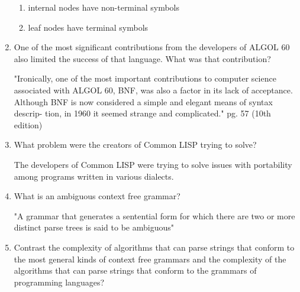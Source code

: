 \begin{enumerate}
\begin{answer}
  \begin{enumerate}
    \item internal nodes have non-terminal symbols
    \item leaf nodes have terminal symbols
    \end{enumerate}

    \end{answer}


  \item One of the most significant contributions from the developers
    of ALGOL 60 also limited the success of that language. What was
    that contribution?

  \begin{answer}

    "Ironically, one of the most important contributions to computer
    science associated with ALGOL 60, BNF, was also a factor in its
    lack of acceptance. Although BNF is now considered a simple and
    elegant means of syntax descrip- tion, in 1960 it seemed strange
    and complicated."  pg. 57 (10th edition)

    \end{answer}

  \item What problem were the creators of Common LISP trying to solve?

  \begin{answer}

    The developers of Common LISP were trying to solve issues with
    portability among programs written in various dialects.

    \end{answer}

  \item What is an ambiguous context free grammar?

  \begin{answer}

    "A grammar that generates a sentential form for which there are
    two or more distinct parse trees is said to be ambiguous"

    \end{answer}

  \item Contrast the complexity of algorithms that can parse strings
    that conform to the most general kinds of context free grammars
    and the complexity of the algorithms that can parse strings that
    conform to the grammars of programming languages?

  \begin{answer}


\end{answer}
\end{enumerate}
